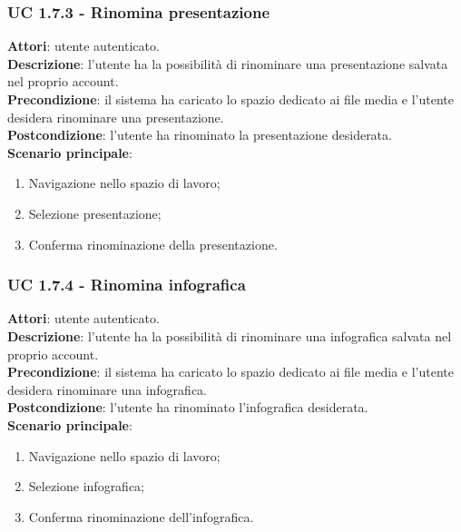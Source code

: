 	\subsubsection{UC 1.7.3 - Rinomina presentazione}{
		\label{uc1.7.3}
		\textbf{Attori}: utente autenticato.	\\
		\textbf{Descrizione}: l'utente ha la possibilità di rinominare una presentazione salvata nel proprio account. \\
		\textbf{Precondizione}: il sistema ha caricato lo spazio dedicato ai file media e l'utente desidera rinominare una presentazione.	\\
		\textbf{Postcondizione}: l'utente ha rinominato la presentazione desiderata.	\\
		\textbf{Scenario principale}:
		\begin{enumerate}
			\item Navigazione nello spazio di lavoro;
			\item Selezione presentazione;
			\item Conferma rinominazione della presentazione.
		\end{enumerate}
		}
	\subsubsection{UC 1.7.4 - Rinomina infografica}{
		\label{uc1.7.4}
		\textbf{Attori}: utente autenticato.	\\
		\textbf{Descrizione}: l'utente ha la possibilità di rinominare una infografica salvata nel proprio account. \\
		\textbf{Precondizione}: il sistema ha caricato lo spazio dedicato ai file media e l'utente desidera rinominare una infografica.	\\
		\textbf{Postcondizione}: l'utente ha rinominato l'infografica desiderata.	\\
		\textbf{Scenario principale}:
		\begin{enumerate}
			\item Navigazione nello spazio di lavoro;
			\item Selezione infografica;
			\item Conferma rinominazione dell'infografica.
		\end{enumerate}
		}
